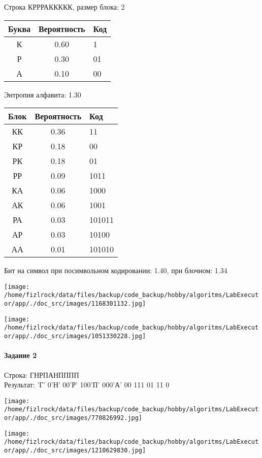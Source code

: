 \documentclass[a4paper, 12pt]{article}
\begin{document}
Строка КРРРАККККК, размер блока: 2
\begin{center}
 \begin{tabular}{ |c|c|l| } 
  \hline
     Буква & Вероятность & Код\\ \hline
К & 0.60 & 1\\\hline
Р & 0.30 & 01\\\hline
А & 0.10 & 00
\\ \hline \end{tabular}
\end{center}
Энтропия алфавита: 1.30
\begin{center}
 \begin{tabular}{ |c|c|l| } 
  \hline
     Блок & Вероятность & Код\\ \hline
КК & 0.36 & 11\\\hline
КР & 0.18 & 00\\\hline
РК & 0.18 & 01\\\hline
РР & 0.09 & 1011\\\hline
КА & 0.06 & 1000\\\hline
АК & 0.06 & 1001\\\hline
РА & 0.03 & 101011\\\hline
АР & 0.03 & 10100\\\hline
АА & 0.01 & 101010
\\ \hline \end{tabular}
\end{center}
Бит на символ при посимвольном кодировании: 1.40, при блочном: 1.34

\texttt{[image: /home/fizlrock/data/files/backup/code\_backup/hobby/algoritms/LabExecutor/app/./doc\_src/images/1168301132.jpg]}

\texttt{[image: /home/fizlrock/data/files/backup/code\_backup/hobby/algoritms/LabExecutor/app/./doc\_src/images/1051330228.jpg]}
\pagebreak
\paragraph{Задание 2}

Строка: 
ГНРПАНПППП\\
Результат: 'Г' 0'Н' 00'Р' 100'П' 000'А' 00 111 01 11 0

\texttt{[image: /home/fizlrock/data/files/backup/code\_backup/hobby/algoritms/LabExecutor/app/./doc\_src/images/770826992.jpg]}

\texttt{[image: /home/fizlrock/data/files/backup/code\_backup/hobby/algoritms/LabExecutor/app/./doc\_src/images/1210629830.jpg]}
\end{document}
